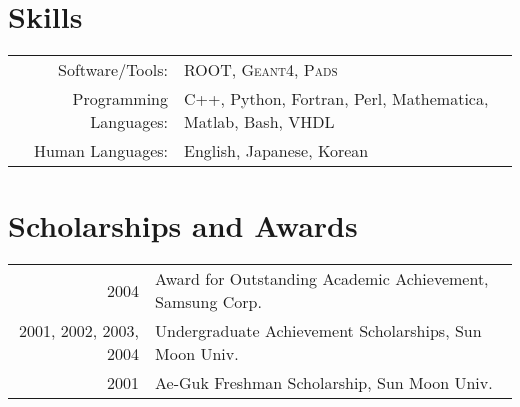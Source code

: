 \documentclass[a4paper,10pt]{article} %
\begin{document}

\section{Skills}

\begin{tabular}{rl}
	Software/Tools: & \textsc{ROOT}, \textsc{Geant4}, \textsc{Pads}\\
	Programming Languages: & C++, Python, Fortran, Perl, Mathematica, Matlab, Bash, VHDL\\
	Human Languages: & English, Japanese, Korean
\end{tabular}


\section{Scholarships and Awards}

\begin{tabular}{rl}
	2004 & Award for Outstanding Academic Achievement, Samsung Corp.\\
	2001, 2002, 2003, 2004 & Undergraduate Achievement Scholarships, Sun Moon
	Univ.\\
	2001 & Ae-Guk Freshman Scholarship, Sun Moon Univ.\\
\end{tabular}


%
%

\end{document}
